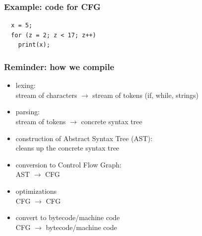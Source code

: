 \documentclass{beamer}
\newenvironment{changemargin}[1]{%
  \begin{list}{}{%
    \setlength{\topsep}{0pt}%
    \setlength{\leftmargin}{#1}%
    \setlength{\rightmargin}{1em}
    \setlength{\listparindent}{\parindent}%
    \setlength{\itemindent}{\parindent}%
    \setlength{\parsep}{\parskip}%
  }%
  \item[]}{\end{list}}
\begin{document}
\begin{frame}[fragile]
  \frametitle{Example: code for CFG}

  \Large
\begin{lstlisting}
  x = 5;
  for (z = 2; z < 17; z++)
    print(x);
\end{lstlisting}
  
\end{frame}

\begin{frame}[fragile]
  \frametitle{Reminder: how we compile}

  \begin{changemargin}{1em}
\begin{itemize}
\item lexing: \\
  \hspace*{1em} stream of characters $\rightarrow$ stream of tokens (if, while, strings)
\item parsing: \\
  \hspace*{1em} stream of tokens $\rightarrow$ concrete syntax tree
\item construction of Abstract Syntax Tree (AST): \\
  \hspace*{1em} cleans up the concrete syntax tree
\item conversion to Control Flow Graph: \\
  \hspace*{1em} AST $\rightarrow$ CFG
\item optimizations\\
  \hspace*{1em} CFG $\rightarrow$ CFG
\item convert to bytecode/machine code\\
  \hspace*{1em} CFG $\rightarrow$ bytecode/machine code
\end{itemize}
  \end{changemargin}
\end{frame}
\end{document}

